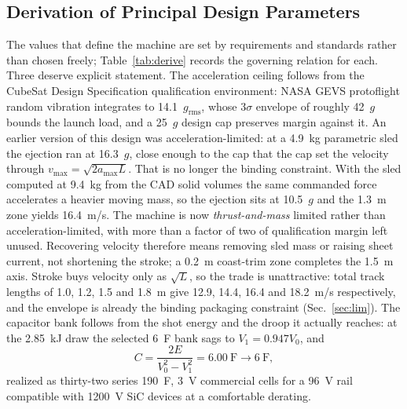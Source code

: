 \documentclass[conference]{IEEEtran}
\begin{document}
\subsection{Derivation of Principal Design Parameters}
The values that define the machine are set by requirements and standards rather than chosen freely; Table~\ref{tab:derive} records the governing relation for each. Three deserve explicit statement. The acceleration ceiling follows from the CubeSat Design Specification qualification environment: NASA GEVS \cite{gevs} protoflight random vibration integrates to 14.1~$g_{\mathrm{rms}}$, whose $3\sigma$ envelope of roughly 42~$g$ bounds the launch load, and a 25~$g$ design cap preserves margin against it. An earlier version of this design was acceleration-limited: at a 4.9~kg parametric sled the ejection ran at 16.3~$g$, close enough to the cap that the cap set the velocity through $v_{\max}=\sqrt{2a_{\max}L}$. That is no longer the binding constraint. With the sled computed at 9.4~kg from the CAD solid volumes the same commanded force accelerates a heavier moving mass, so the ejection sits at 10.5~$g$ and the 1.3~m zone yields 16.4~m/s. The machine is now \emph{thrust-and-mass} limited rather than acceleration-limited, with more than a factor of two of qualification margin left unused. Recovering velocity therefore means removing sled mass or raising sheet current, not shortening the stroke; a 0.2~m coast-trim zone completes the 1.5~m axis. Stroke buys velocity only as $\sqrt{L}$, so the trade is unattractive: total track lengths of 1.0, 1.2, 1.5 and 1.8~m give 12.9, 14.4, 16.4 and 18.2~m/s respectively, and the envelope is already the binding packaging constraint (Sec.~\ref{sec:lim}). The capacitor bank follows from the shot energy and the droop it actually reaches: at the 2.85~kJ draw the selected 6~F bank sags to $V_1=0.947V_0$, and
\begin{equation}
C=\frac{2E}{V_0^2-V_1^2}=6.00~\mathrm{F}\rightarrow 6~\mathrm{F},
\end{equation}
realized as thirty-two series 190~F, 3~V commercial cells for a 96~V rail compatible with 1200~V SiC devices at a comfortable derating.
\end{document}
